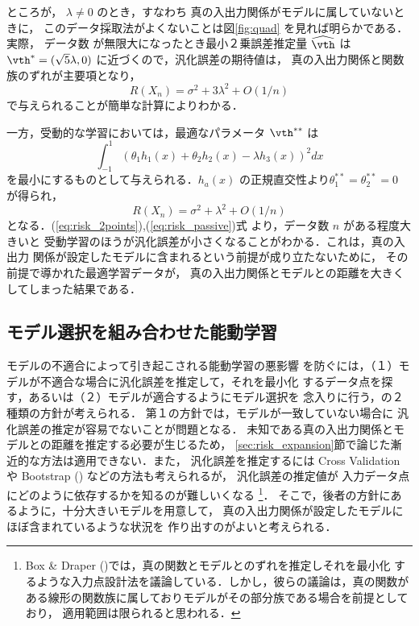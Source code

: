 \documentclass[master]{cimt}
\newcommand{\hvth}{\widehat{{\vth}}}
\begin{document}
ところが， $\lambda \neq 0$ のとき，すなわち
真の入出力関係がモデルに属していないときに，
このデータ採取法がよくないことは図\ref{fig:quad}
を見れば明らかである．実際，
データ数
が無限大になったとき最小２乗誤差推定量 $\hvth $ は $\vth^* = (
\sqrt{5} \lambda, 0)$ に近づくので，汎化誤差の期待値は，
真の入出力関係と関数族のずれが主要項となり，
\begin{equation}
	R (X_n)  = \sigma^2 + 3 \lambda^2 + O(1/n)
\label{eq:risk_2points}
\end{equation}
で与えられることが簡単な計算によりわかる．

一方，受動的な学習においては，最適なパラメータ $\vth^{**}$ は
\[
	\int_{-1}^1 ( \theta_1 h_1(x)+ \theta_2 h_2(x) - \lambda h_3(x) )^2 
	dx 
\]
を最小にするものとして与えられる．$h_a(x)$ の正規直交性より$
	\theta_1^{**} = \theta_2^{**} = 0
$
が得られ，
\begin{equation}
\label{eq:risk_passive}
	R(X_n)  =  \sigma^2
	+ \lambda^2 + O(1/n)
\end{equation}
となる．(\ref{eq:risk_2points}),(\ref{eq:risk_passive})式
より，データ数 $n$ がある程度大きいと
受動学習のほうが汎化誤差が小さくなることがわかる．これは，真の入出力
関係が設定したモデルに含まれるという前提が成り立たないために，
その前提で導かれた最適学習データが，
真の入出力関係とモデルとの距離を大きくしてしまった結果である．




\subsection{モデル選択を組み合わせた能動学習}
モデルの不適合によって引き起こされる能動学習の悪影響
を防ぐには，（１）モデルが不適合な場合に汎化誤差を推定して，それを最小化
するデータ点を探す，あるいは（２）モデルが適合するようにモデル選択を
念入りに行う，の２種類の方針が考えられる．
第１の方針では，モデルが一致していない場合に
汎化誤差の推定が容易でないことが問題となる．
未知である真の入出力関係とモデルとの距離を推定する必要が生じるため，
\ref{sec:risk_expansion}節で論じた漸近的な方法は適用できない．また，
汎化誤差を推定するには
Cross Validation や Bootstrap (\cite{Bootstrap}) などの方法も考えられるが，
汎化誤差の推定値が
入力データ点にどのように依存するかを知るのが難しいくなる
\footnote{Box \& Draper 
(\cite{BoxDraper1959})では，真の関数とモデルとのずれを推定しそれを最小化
するような入力点設計法を議論している．しかし，彼らの議論は，真の関数が
ある線形の関数族に属しておりモデルがその部分族である場合を前提としており，
適用範囲は限られると思われる．}．
そこで，後者の方針にあるように，十分大きいモデルを用意して，
真の入出力関係が設定したモデルにほぼ含まれているような状況を
作り出すのがよいと考えられる．
\end{document}
